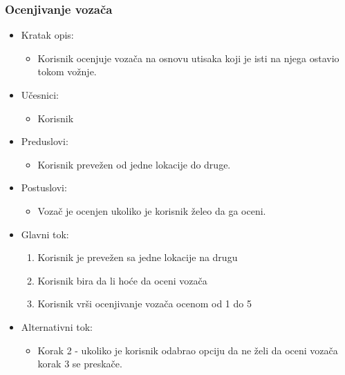 \subsubsection{\bfseries Ocenjivanje voza\v ca}
\begin{itemize}
	\item Kratak opis:
		\begin{itemize}
			\item Korisnik ocenjuje vozača na osnovu utisaka koji je isti na njega ostavio tokom vožnje.
		\end{itemize}
 
	\item Učesnici:
		\begin{itemize}
			\item Korisnik
		\end{itemize}				

	\item Preduslovi:
		\begin{itemize}
		    \item Korisnik prevežen od jedne lokacije do druge.
		\end{itemize}

	\item Postuslovi:
		\begin{itemize}
			\item Vozač je ocenjen ukoliko je korisnik želeo da ga oceni.
		\end{itemize}		


	\item Glavni tok:
		\begin{enumerate}
		    \item Korisnik je prevežen sa jedne lokacije na drugu
		    \item Korisnik bira da li hoće da oceni vozača
		    \item Korisnik vrši ocenjivanje vozača ocenom od 1 do 5 
		     
		\end{enumerate}

	\item Alternativni tok:
		\begin{itemize}
    		\item Korak 2 - ukoliko je korisnik odabrao opciju da ne želi da oceni vozača korak 3 se preskače.
		\end{itemize}
\end{itemize}

